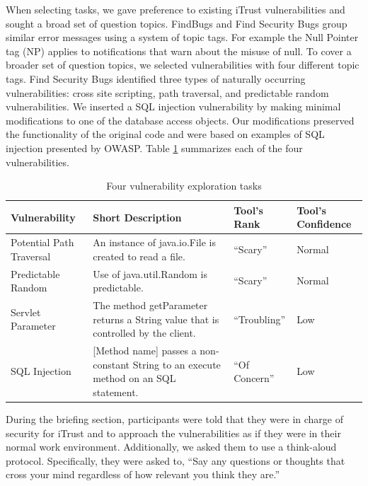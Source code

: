 \documentclass[conference]{IEEEtran}
\begin{document}
When selecting tasks, we gave preference to existing iTrust vulnerabilities and sought a broad set of question topics.  
FindBugs and Find Security Bugs group similar error messages using a system of topic tags. For example the Null Pointer tag (NP) applies to notifications that warn about the misuse of null. 
To cover a broader set of question topics, we selected vulnerabilities with four different topic tags.
Find Security Bugs identified three types of naturally occurring vulnerabilities: cross site scripting, path traversal, and predictable random vulnerabilities.
We inserted a SQL injection vulnerability by making minimal modifications to one of the database access objects.
Our modifications preserved the functionality of the original code and were based on examples of SQL injection presented by OWASP.
Table \ref{table:vulnerabilities} summarizes each of the four vulnerabilities. 

\begin{table} 
\centering
\caption{Four vulnerability exploration tasks}
\begin{tabular}{|l|l|l|l|}
\rowcolor{gray!50}
\hline
    Vulnerability				& Short Description													& Tool's Rank 						& Tool's Confidence\\
    \hline	
    Potential Path Traversal	& An instance of java.io.File is created to read a file.     			& ``Scary''							 	&  Normal\\
    \hline
    Predictable Random			& Use of java.util.Random is predictable. 								& ``Scary''								&  Normal\\
    \hline
    Servlet Parameter 			& The method getParameter returns a String value that is controlled by the client.			& ``Troubling''		&  Low\\
    \hline
    SQL Injection				& [Method name] passes a non-constant String to an execute method on an SQL statement.     	& ``Of Concern''		&  Low\\
    \hline
\end{tabular}
\label{table:vulnerabilities}
\end{table}

During the briefing section, participants were told that they were in charge of security for iTrust and to approach the vulnerabilities as if they were in their normal work environment.
Additionally, we asked them to use a think-aloud protocol. Specifically, they were asked to, ``Say any questions or thoughts that cross your mind regardless of how relevant you think they are.''
\end{document}
